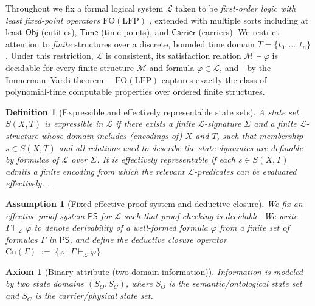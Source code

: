 \documentclass[journal]{IEEEtran}
\newcommand{\Cn}{\text{Cn}}
\newtheorem{axiom}{Axiom}[section]
\newtheorem{assumption}{Assumption}[section]
\newtheorem{definition}{Definition}[section]
\numberwithin{equation}{section}
\begin{document}
Throughout we fix a formal logical system \(\mathcal{L}\) taken to be
\emph{first-order logic with least fixed-point operators} \(\mathrm{FO(LFP)}\)
\cite{immerman1999descriptive}, extended with multiple sorts including at least
\(\mathsf{Obj}\) (entities), \(\mathsf{Time}\) (time points), and \(\mathsf{Carrier}\) (carriers).
We restrict attention to \emph{finite} structures over a discrete, bounded time domain
\(T=\{t_0,\ldots,t_n\}\).
Under this restriction, \(\mathcal{L}\) is consistent, its satisfaction relation
\(\mathcal{M}\models\varphi\) is decidable for every finite structure \(\mathcal{M}\) and formula
\(\varphi\in\mathcal{L}\), and---by the Immerman--Vardi theorem
\cite{immerman1982relational,vardi1982complexity}---\(\mathrm{FO(LFP)}\) captures exactly the class of
polynomial-time computable properties over ordered finite structures.

\begin{definition}[Expressible and effectively representable state sets]
\label{def:expressible-effective}
A state set \(S(X,T)\) is \emph{expressible in \(\mathcal{L}\)} if there exists a finite
\(\mathcal L\)-signature \(\Sigma\) and a finite \(\mathcal L\)-structure whose domain includes (encodings of)
\(X\) and \(T\), such that membership \(s\in S(X,T)\) and all relations used to describe the state dynamics
are definable by formulas of \(\mathcal L\) over \(\Sigma\).
It is \emph{effectively representable} if each \(s\in S(X,T)\) admits a finite encoding from which the
relevant \(\mathcal{L}\)-predicates can be evaluated effectively.
\cite{qiu2025research}.
\end{definition}

\begin{assumption}[Fixed effective proof system and deductive closure]
\label{assump:proof-system}
We fix an effective proof system \(\mathsf{PS}\) for \(\mathcal L\) such that proof checking is decidable.
We write \(\Gamma \vdash_{\mathcal L} \varphi\) to denote derivability of a well-formed formula \(\varphi\)
from a \emph{finite} set of formulas \(\Gamma\) in \(\mathsf{PS}\), and define the deductive closure operator
\(
\Cn(\Gamma)\;:=\;\{\varphi:\ \Gamma\vdash_{\mathcal L}\varphi\}.
\)
\end{assumption}

\begin{axiom}[Binary attribute (two-domain information)]
\label{ax:binary-attribute}
Information is modeled by two state domains \((S_O,S_C)\), where \(S_O\) is the semantic/ontological
state set and \(S_C\) is the carrier/physical state set.
\end{axiom}
\end{document}
